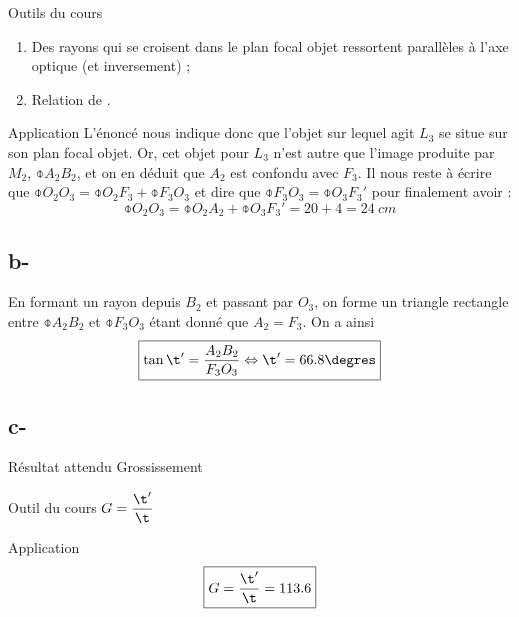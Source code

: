 \documentclass[10pt,notitlepage]{book}
\begin{document}
\begin{NCdemo}{Outils du cours}
    \begin{enumerate}

        \item Des rayons qui se croisent dans le plan focal objet ressortent
            parallèles à l'axe optique (et inversement) ;

        \item Relation de .
    \end{enumerate}
\end{NCdemo}

\begin{NCexem}{Application}
    L'énoncé nous indique donc que l'objet sur lequel agit $L_3$ se situe sur
    son plan focal objet. Or, cet objet pour $L_3$ n'est autre que l'image
    produite par $M_2$, $\obar{A_2B_2}$, et on en déduit que $A_2$ est confondu
    avec $F_3$. Il nous reste à écrire que $\obar{O_2O_3} = \obar{O_2F_3} +
    \obar{F_3O_3}$ et dire que $\obar{F_3O_3} = \obar{O_3F_3'}$ pour finalement
    avoir :
    \[ \boxed{\obar{O_2O_3} = \obar{O_2A_2} + \obar{O_3F_3'} = 20 + 4 =
    \SI{24}{cm}} \]
\end{NCexem}

\setcounter{subsection}{2}
\subsection{b-}
En formant un rayon depuis $B_2$ et passant par $O_3$, on forme un triangle
rectangle entre $\obar{A_2B_2}$ et $ \obar{F_3O_3}$ étant donné que $A_2 = F_3$.
On a ainsi \[ \boxed{\tan\t' = \frac{A_2B_2}{F_3O_3} \Leftrightarrow \t' =
66.8\degres}\]

\setcounter{subsection}{2}
\subsection{c-}
\begin{NCprop}{Résultat attendu}
    Grossissement
\end{NCprop}

\begin{NCdemo}{Outil du cours}
    $ \displaystyle G = \frac{\t'}{\t}$
\end{NCdemo}

\begin{NCexem}{Application}
    \[ \boxed{G = \frac{\t'}{\t} = 113.6} \]
\end{NCexem}
\end{document}
